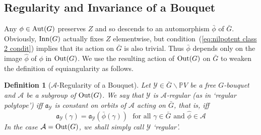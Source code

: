 \documentclass[12pt]{article}
\newtheorem{defn}{Definition}[section]
\newcommand{\addwords}[1]{\ \ \ \mbox{#1}}
\newcommand{\Aut}{{\rm Aut}}
\newcommand{\PVmodbarG}{\ensuremath{
\bar{G}\backslash \bbP V}}
\newcommand{\bbP}{\ensuremath{\mathbb{P}}}
\newcommand{\bbR}{\ensuremath{\mathbb{R}}}
\newcommand{\br}{\ensuremath{{\bf r}}}
\newcommand{\cA}{\ensuremath{\mathcal{A}}}
\newcommand{\cE}{\ensuremath{\mathcal{E}}}
\newcommand{\cS}{\ensuremath{\mathcal{S}}}
\newcommand{\cY}{\ensuremath{\mathcal{Y}}}
\newcommand{\fa}{\ensuremath{\mathfrak{a}}}
\newcommand{\Inn}{{\rm Inn}}
\newcommand{\Out}{{\rm Out}}
\newcommand{\rAng}{{\rm Ang^\bbR}}
\newcommand{\sep}{\ \\================================================== \\}
\newcommand{\barG}{\ensuremath{\bar{G}}}
\begin{document}
\subsection{Regularity and Invariance of a Bouquet}\label{subsec:Reg and Inv}
Any $\phi\in\Aut(G)$ preserves $Z$ and so descends to an automorphism  $\bar{\phi}$ of $\barG$. Obviously, $\Inn(G)$ actually fixes $Z$ elementwise, but  condition~(\ref{eq:nilpotent class 2 condit}) implies that its action on $\barG$ is also trivial. Thus $\bar{\phi}$ depends only on the image $\hat{\phi}$ of $\phi$ in $\Out(G)$. We use the resulting action of $\Out(G)$ on $\bar{G}$ to weaken the definition of equiangularity as follows.
\begin{defn}[$\cA$-Regularity of a Bouquet]\label{def:S-Regularity and Regularity}
	Let $\cY\in\PVmodbarG$ be a \emph{free} $G$-bouquet and $\cA$ be a subgroup of $\Out(G)$. We say that $\cY$ is {\em $\cA$-regular} (as in {\em `regular polytope'}) iff
	$\fa_\cY$ is constant on orbits of $\cA$ acting on $\barG$, that is, iff  
	\begin{equation}\label{eq:condition for S-regularity}
		\fa_\cY(\gamma)=\fa_\cY(\bar{\phi}(\gamma))\addwords{for all $\gamma\in \barG$ and $\hat{\phi}\in \cA$}
	\end{equation}
	In the case $\cA=\Out(G)$, we shall simply call $\cY$ {\em `regular'}.
\end{defn}
\end{document}
